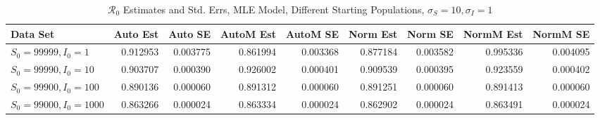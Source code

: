 \documentclass[12pt]{article}
\newcommand{\rr}{\ensuremath{\mathcal{R}_0}}
\begin{document}
\begin{table}[H]
	
	\caption{$\rr$ Estimates and Std. Errs, MLE Model,
		Different Starting Populations, 
		$\sigma_S = 10, \sigma_I = 1$}
	\begin{footnotesize}
		\hskip -1.7cm
	\begin{tabular}{l|r|r|r|r|r|r|r|r}
		\hline
		Data Set & Auto Est & Auto SE & AutoM Est & AutoM SE & Norm Est & Norm SE & NormM Est & NormM SE\\
		\hline
		$S_0 = 99999, I_0 = 1$ & 0.912953 & 0.003775 & 0.861994 & 0.003368 & 0.877184 & 0.003582 & 0.995336 & 0.004095\\
		\hline
		$S_0 = 99990, I_0 = 10$ & 0.903707 & 0.000390 & 0.926002 & 0.000401 & 0.909539 & 0.000395 & 0.923559 & 0.000402\\
		\hline
		$S_0 = 99900, I_0 = 100$ & 0.890136 & 0.000060 & 0.891312 & 0.000060 & 0.891251 & 0.000060 & 0.891413 & 0.000060\\
		\hline
		$S_0 = 99000, I_0 = 1000$ & 0.863266 & 0.000024 & 0.863334 & 0.000024 & 0.862902 & 0.000024 & 0.863491 & 0.000024\\
		\hline
	\end{tabular}
\end{footnotesize}
\end{table}
\end{document}
